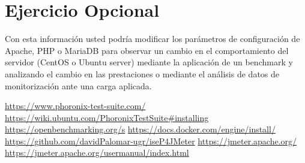 \documentclass[a4paper]{article}
\begin{document}
\section{Ejercicio Opcional}
Con esta información usted podría modificar los parámetros
de configuración de Apache, PHP o MariaDB para observar un cambio en el
comportamiento del servidor (CentOS o Ubuntu server) mediante la aplicación
de un benchmark y analizando el cambio en las prestaciones o mediante el análisis
de datos de monitorización ante una carga aplicada.
\newpage
\begin{thebibliography}{99}
    \href{https://www.phoronix-test-suite.com/}{https://www.phoronix-test-suite.com/}
    \href{https://wiki.ubuntu.com/PhoronixTestSuite#installing}{https://wiki.ubuntu.com/PhoronixTestSuite\#installing}
    \href{https://openbenchmarking.org/s}{https://openbenchmarking.org/s}
    \href{https://docs.docker.com/engine/install/}{https://docs.docker.com/engine/install/}
    \href{https://github.com/davidPalomar-ugr/iseP4JMeter}{https://github.com/davidPalomar-ugr/iseP4JMeter}
    \href{https://jmeter.apache.org/}{https://jmeter.apache.org/}
    \href{https://jmeter.apache.org/usermanual/index.html}{https://jmeter.apache.org/usermanual/index.html}
\end{thebibliography}
\end{document}

